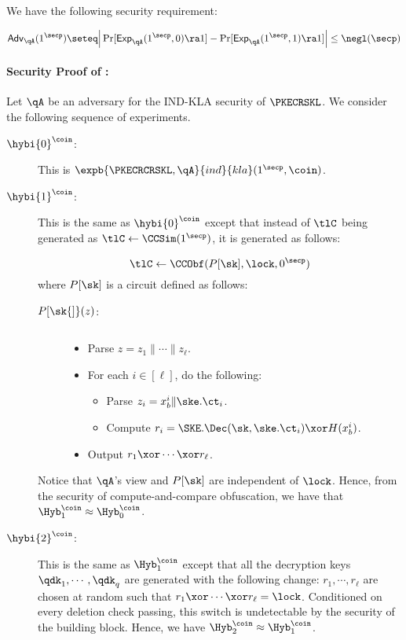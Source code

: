 We have the following security requirement:

$$\mathsf{Adv}_\qA(1^\secp) \seteq \Big\lvert
\Pr[\mathsf{Exp}_\qA(1^\secp, 0) \ra 1] -
\Pr[\mathsf{Exp}_\qA(1^\secp, 1) \ra 1]\Big\rvert \le \negl(\secp)$$

\paragraph{Security Proof of \tPKECRCRSKL:}

Let $\qA$ be an adversary for the IND-KLA security of $\PKECRSKL$.
We consider the following sequence of experiments.
\begin{description}
\item[$\hybi{0}^\coin$:] This is
$\expb{\PKECRCRSKL,\qA}{ind}{kla}(1^\secp,\coin)$.

\item[$\hybi{1}^\coin$:] This is the same as $\hybi{0}^\coin$ except
that instead of $\tlC$ being generated as $\tlC \gets
\CCSim(1^\secp)$, it is generated as follows:

$$\tlC \gets \CCObf(P[\sk], \lock, 0^\secp)$$ where $P[\sk]$ is a
circuit defined as follows:

\begin{description}
\item[$P{[}\sk{]}(z)$:] $ $
\begin{itemize}
\item Parse $z = z_1 \| \cdots \| z_\ell$.
\item For each $i \in [\ell]$, do the following:
\begin{itemize}
\item Parse $z_i = x^i_b \| \ske.\ct_i$.
\item Compute $r_i = \SKE.\Dec(\sk, \ske.\ct_i) \xor H(x_b^i)$.
\end{itemize}
\item Output $r_1 \xor \cdots \xor r_\ell$.
\end{itemize}
\end{description}

Notice that $\qA$'s view and $P[\sk]$ are independent of $\lock$.
Hence, from the security of compute-and-compare obfuscation, we have
that $\Hyb_1^\coin \approx \Hyb_0^\coin$.

\item[$\hybi{2}^\coin$:] This is the same as $\Hyb_1^\coin$ except
that all the decryption keys $\qdk_1, \cdots, \qdk_q$ are generated
with the following change: $r_1, \cdots, r_\ell$ are chosen at
random such that $r_1 \xor \cdots \xor r_\ell = \lock$. Conditioned
on every deletion check passing, this switch is undetectable by the
security of the building block. Hence, we have $\Hyb_2^\coin \approx
\Hyb_1^\coin$. 


\end{description}
